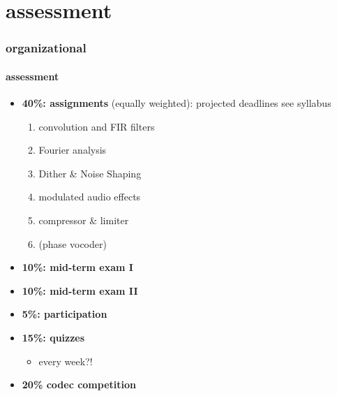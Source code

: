     \section{assessment}
        \begin{frame}\frametitle{organizational}\framesubtitle{assessment}
            \begin{itemize}
                \item	\textbf{40\%: assignments} (equally weighted): projected deadlines see syllabus
                        \begin{enumerate}
                            \item	convolution and FIR filters
                            \item   Fourier analysis
                            \item   Dither \& Noise Shaping
                            \item   modulated audio effects
                            \item   compressor \& limiter
                            \item   (phase vocoder)
                        \end{enumerate}

                \smallskip
                \item   \textbf{10\%: mid-term exam I}
                \item   \textbf{10\%: mid-term exam II}

                \smallskip
                \item   \textbf{5\%: participation}

                \smallskip
                \item   \textbf{15\%: quizzes}
                    \begin{itemize}
                        \item   every week?! 
                    \end{itemize}
                
                \smallskip
                \item   \textbf{20\% codec competition}
            \end{itemize}
        \end{frame}

